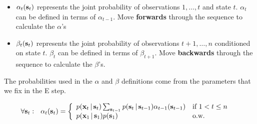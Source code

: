 \documentclass[12pt]{article}
\begin{document}
\begin{itemize}
	
	\item $\alpha_t(\mathbf{s}_t)$ represents the joint probability of observations $1,\ldots,t$ and state $t$. $\alpha_t$ can be defined in terms of $\alpha_{t-1}$. Move \textbf{forwards} through the sequence to calculate the $\alpha$'s
	
	\item $\beta_t(\mathbf{s}_t)$ represents the joint probability of observations $t+1,\ldots,n$ conditioned on state $t$. $\beta_{t}$ can be defined in terms of $\beta_{t+1}$. Move \textbf{backwards} through the sequence to calculate the $\beta$'s.
	
\end{itemize}


\begin{figure}[H]%
	\centering
	\qquad
	\label{fig:example}%
\end{figure}

The probabilities used in the $\alpha$ and $\beta$ definitions come from the parameters that we fix in the E step.

{\small 
	\begin{align*}
	\forall \bolds_t:\ \ 
	\alpha_t(\bolds_t)&=\left\{
	\begin{array}{ll}
	p(\boldx_t\given \bolds_t)\sum_{\bolds_{t-1}} p(\bolds_t\given\bolds_{t-1})\alpha_{t-1}(\bolds_{t-1}) &\mbox{if $1<t\leq n$}\\
	p(\boldx_1\given \bolds_1)p(\bolds_1) &\mbox{o.w.}
	\end{array}
	\right.
	\end{align*}
}
\end{document}
